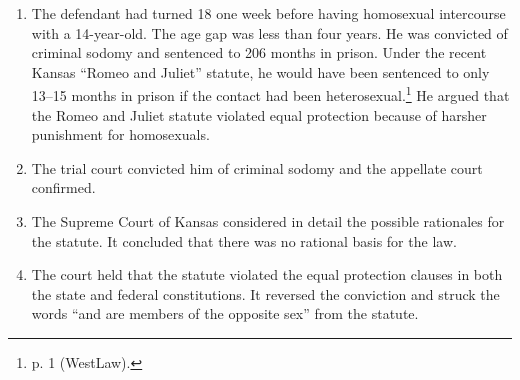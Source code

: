 \begin{enumerate}
    \item The defendant had turned 18 one week before having homosexual 
    intercourse with a 14-year-old. The age gap was less than four years. He 
    was convicted of criminal sodomy and sentenced to 206 months in prison. 
    Under the recent Kansas ``Romeo and Juliet'' statute, he would have been 
    sentenced to only 13--15 months in prison if the contact had been 
    heterosexual.\footnote{p. 1 (WestLaw).} He argued that the Romeo and 
    Juliet statute violated equal protection because of harsher punishment for 
    homosexuals.
    \item The trial court convicted him of criminal sodomy and the appellate 
    court confirmed.
    \item The Supreme Court of Kansas considered in detail the possible 
    rationales for the statute. It concluded that there was no rational basis 
    for the law.
    \item The court held that the statute violated the equal protection 
    clauses in both the state and federal constitutions. It reversed the 
    conviction and struck the words ``and are members of the opposite sex'' 
    from the statute.
\end{enumerate}
